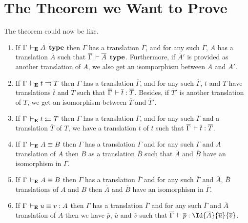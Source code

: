 \newcommand{\nextcase}{\item~}

\DeclareMathOperator{\J}{\mathbf{J}}
\DeclareMathOperator{\type}{\mathbf{type}}
\newcommand\infers{\rightrightarrows}
\newcommand\checks{\leftleftarrows}
\newcommand\barG{\overline{\Gamma}}
\newcommand\bart{\overline{t}}
\newcommand\barT{\overline{T}}
\newcommand\barA{\overline{A}}
\newcommand\barB{\overline{B}}
\newcommand\baru{\overline{u}}
\newcommand\barv{\overline{v}}
\newcommand\barp{\overline{p}}



\section{The Theorem we Want to Prove}

The theorem could now be like.

\begin{theorem}
  \leavevmode
  \begin{enumerate}
    \item If $\Gamma \dere A\ \type$ then $\Gamma$ has a translation $\barG$,
    and for any such $\barG$, $A$ has a translation $\barA$ such that
    $\barG \der \barA\ \type$. Furthermore, if $\barA'$ is provided as another
    translation of $A$, we also get an isomporphism between $\barA$ and
    $\barA'$.
    \item If $\Gamma \dere t \infers T$ then $\Gamma$ has a translation $\barG$,
    and for any such $\barG$, $t$ and $T$ have translations $\bart$ and $\barT$
    such that $\barG \der \bart : \barT$. Besides, if $\barT'$ is another
    translation of $T$, we get an isomorphism between $\barT$ and $\barT'$.
    \item If $\Gamma \dere t \checks T$ then $\Gamma$ has a translation $\barG$,
    and for any such $\barG$ and a translation $\barT$ of $T$, we have a
    translation $\bart$ of $t$ such that $\barG \der \bart : \barT$.
    \item If $\Gamma \,\vdash_\mathbf{E} A \equiv B$ then $\Gamma$ has a translation $\barG$
    and for any such $\barG$ and $\barA$ translation of $A$ then $B$ as a
    translation $\barB$ such that $\barA$ and $\barB$ have an isomorphism in
    $\barG$.
    \item If $\Gamma \,\vdash_\mathbf{E} A \equiv B$ then $\Gamma$ has a translation $\barG$
    and for any such $\barG$ and $\barA$, $\barB$ translations of $A$ and $B$
    then $\barA$ and $\barB$ have an isomorphism in $\barG$.
    \item  If $\Gamma \,\vdash_\mathbf{E} u \equiv v : A$ then $\Gamma$ has a translation
    $\barG$ and for any such $\barG$ and $\barA$ translation of $A$ then we
    have $\barp$, $\baru$ and $\barv$ such that
    $\barG \der \barp : \Id{\barA}{\baru}{\barv}$.
  \end{enumerate}
\end{theorem}


